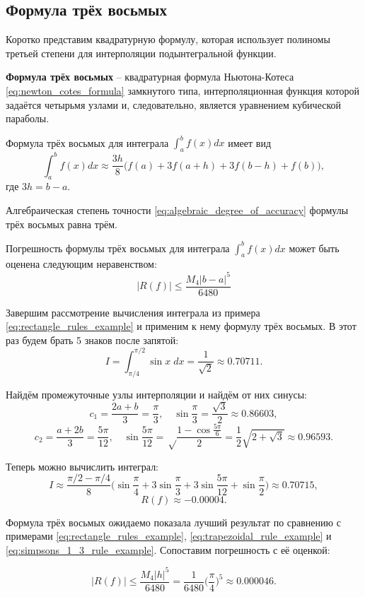 \documentclass[../main.tex]{subfile}
\begin{document}
\subsection{Формула трёх восьмых}
Коротко представим квадратурную формулу, которая использует полиномы третьей
степени для интерполяции подынтегральной функции.

\begin{define}
	\textbf{Формула трёх восьмых} -- квадратурная формула Ньютона-Котеса
	\eqref{eq:newton_cotes_formula} замкнутого типа, интерполяционная
	функция которой задаётся четырьмя узлами и, следовательно, является
	уравнением кубической параболы.
\end{define}

\begin{theorem}\label{eq:simpsons_3_8_rule}
	Формула трёх восьмых для интеграла $\int_a^b f(x)dx$ имеет вид
	\[\boxed{\int_a^b f(x)dx\approx\frac{3h}{8}\big(f(a)+3f(a+h)+3f(b-h)+
	f(b)\big)},\]
	где $3h=b-a$.
\end{theorem}
\proofexercise



\begin{lemma}
	Алгебраическая степень точности \eqref{eq:algebraic_degree_of_accuracy}
	формулы трёх восьмых равна трём.
\end{lemma}
\proofexercise

\begin{theorem}
	Погрешность формулы трёх восьмых для интеграла $\int_a^b f(x)dx$ может
	быть оценена следующим неравенством:
	\[\boxed{|R(f)|\le\frac{M_4|b-a|^5}{6480}}\]
\end{theorem}
\proofexercise

\begin{example}
	Завершим рассмотрение вычисления интеграла из примера
	\eqref{eq:rectangle_rules_example} и применим к нему формулу трёх
	восьмых. В этот раз будем брать 5 знаков после запятой:
	\[I=\int_{\pi/4}^{\pi/2}\sin x\;dx=\frac{1}{\sqrt 2}\approx 0.70711.\]

	Найдём промежуточные узлы интерполяции и найдём от них синусы:
	\[c_1=\frac{2a+b}{3}=\frac{\pi}{3},\quad\sin\frac{\pi}{3}=\frac{\sqrt 3}
	{2}\approx 0.86603,\]
	\[c_2=\frac{a+2b}{3}=\frac{5\pi}{12},\quad\sin\frac{5\pi}{12}=
	\sqrt\frac{1-\cos\frac{5\pi}{6}}{2}=\frac{1}{2}\sqrt{2+\sqrt 3}
	\approx 0.96593.\]

	Теперь можно вычислить интеграл:
	\[I\approx\frac{\pi/2-\pi/4}{8}\Big(\sin\frac{\pi}{4}+
	3\sin\frac{\pi}{3}+3\sin\frac{5\pi}{12}+\sin\frac{\pi}{2}\Big)
	\approx 0.70715,\]
	\[R(f)\approx -0.00004.\]

	Формула трёх восьмых ожидаемо показала лучший результат по сравнению с
	примерами \eqref{eq:rectangle_rules_example},
	\eqref{eq:trapezoidal_rule_example} и
	\eqref{eq:simpsons_1_3_rule_example}. Сопоставим погрешность с её оценкой:

	\[|R(f)|\le\frac{M_4|h|^5}{6480}=\frac{1}{6480}\Big(\frac{\pi}{4}
	\Big)^5\approx 0.000046.\]
\end{example}
\end{document}
